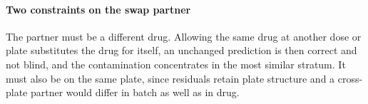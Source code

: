 %
%




\paragraph{Two constraints on the swap partner} The partner must be a different
drug. Allowing the same drug at another dose or plate substitutes the drug for
itself, an unchanged prediction is then correct and not blind, and the contamination
concentrates in the most similar stratum. It must also be on the same plate,
since residuals retain plate structure and a cross-plate partner would differ in
batch as well as in drug.

